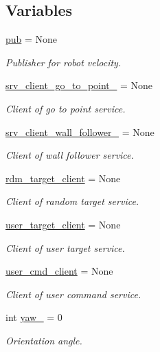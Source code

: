 \subsection*{Variables}
\begin{DoxyCompactItemize}
\item 
\hyperlink{namespacebug__m_adc14150838edf40c8028207cd6bb2082}{pub} = None
\begin{DoxyCompactList}\small\item\em Publisher for robot velocity. \end{DoxyCompactList}\item 
\hyperlink{namespacebug__m_abd32bbd25b55f71e56505e72ba56c2f6}{srv\+\_\+client\+\_\+go\+\_\+to\+\_\+point\+\_\+} = None
\begin{DoxyCompactList}\small\item\em Client of go to point service. \end{DoxyCompactList}\item 
\hyperlink{namespacebug__m_af40e8063430e5b54ef2f3f8368338744}{srv\+\_\+client\+\_\+wall\+\_\+follower\+\_\+} = None
\begin{DoxyCompactList}\small\item\em Client of wall follower service. \end{DoxyCompactList}\item 
\hyperlink{namespacebug__m_aaeea805feba4dc593b505d3935707987}{rdm\+\_\+target\+\_\+client} = None
\begin{DoxyCompactList}\small\item\em Client of random target service. \end{DoxyCompactList}\item 
\hyperlink{namespacebug__m_ac15f809b3beeffde1c35d3483fe0f07d}{user\+\_\+target\+\_\+client} = None
\begin{DoxyCompactList}\small\item\em Client of user target service. \end{DoxyCompactList}\item 
\hyperlink{namespacebug__m_a714bf24ade1dcbaabdd0e6e1779871bd}{user\+\_\+cmd\+\_\+client} = None
\begin{DoxyCompactList}\small\item\em Client of user command service. \end{DoxyCompactList}\item 
int \hyperlink{namespacebug__m_a8b5b5c9259592b8efd526c5adb95d95b}{yaw\+\_\+} = 0
\begin{DoxyCompactList}\small\item\em Orientation angle. \end{DoxyCompactList}\item 

\end{DoxyCompactItemize}
